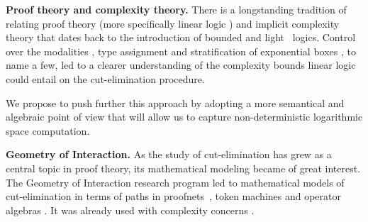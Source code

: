 \textbf{Proof theory and complexity theory.}
There is a longstanding tradition of relating proof theory (more specifically linear logic \cite{girard_linear_1987}) and implicit complexity theory that dates back to the introduction of bounded \cite{Girard1992} and light~\cite{girard_light_1994} logics.
Control over the modalities \cite{schopp_stratified_2007,Lago2010}, %
type assignment \cite{gaboardi_logical_2008} and stratification of exponential boxes \cite{baillot_linear_2010}, to name a few, led to a clearer understanding of the complexity bounds linear logic could entail on the cut-elimination procedure.

We propose to push further this approach by adopting a more semantical and algebraic point of view that will allow us to capture non-deterministic logarithmic space computation.

\smallskip\noindent
\textbf{Geometry of Interaction.}
As the study of cut-elimination has grew as a central topic in proof theory, its mathematical modeling became of great interest.
The Geometry of Interaction \cite{girard_towards_1989} research program led to mathematical models of cut-elimination in terms of paths in proofnets~\cite{asperti_paths_1994}, token machines \cite{laurent_token_2001} and operator algebras \cite{girard_geometry_1989}.
It was already used with complexity concerns \cite{baillot_elementary_2001,girard_normativity_2012}. %

